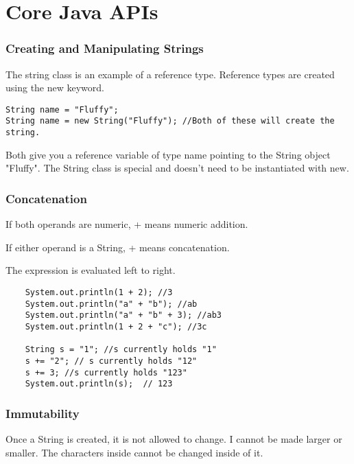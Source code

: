 \documentclass[a4paper]{report}   %
\begin{document}
\chapter{Core Java APIs}

\subsection{Creating and Manipulating Strings}

The string class is an example of a reference type. Reference types are created using the new keyword. 

\begin{lstlisting}
String name = "Fluffy";
String name = new String("Fluffy"); //Both of these will create the string.
\end{lstlisting}

Both give you a reference variable of type name pointing to the String object "Fluffy". The String class is special and doesn't need to be instantiated with new.


\subsection{Concatenation}

\begin{list}{•}{•}
\item If both operands are numeric, + means numeric addition.
\item If either operand is a String, + means concatenation.
\item The expression is evaluated left to right.
\end{list}

\begin{lstlisting}
	System.out.println(1 + 2); //3
	System.out.println("a" + "b"); //ab
	System.out.println("a" + "b" + 3); //ab3
	System.out.println(1 + 2 + "c"); //3c
	
	String s = "1"; //s currently holds "1"
	s += "2"; // s currently holds "12"
	s += 3; //s currently holds "123"
	System.out.println(s);	// 123
\end{lstlisting}

\subsection{Immutability}

Once a String is created, it is not allowed to change. I cannot be made larger or smaller. The characters inside cannot be changed inside of it.
\end{document}
